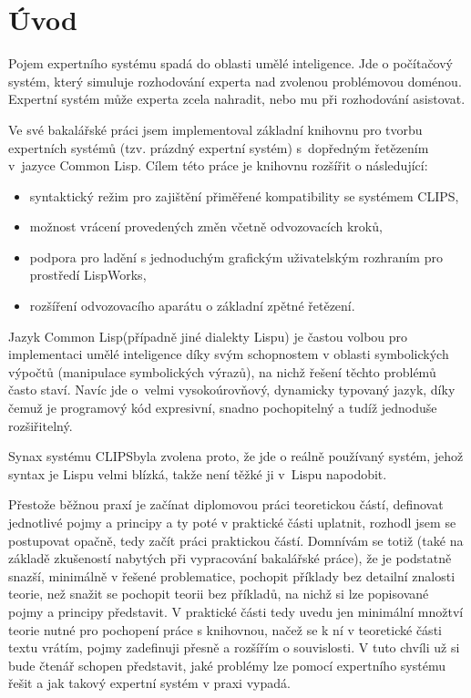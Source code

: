 \section{Úvod}

Pojem expertního systému spadá do oblasti umělé inteligence. Jde o počítačový
systém, který simuluje rozhodování experta nad zvolenou problémovou doménou.
Expertní systém může experta zcela nahradit, nebo mu při rozhodování asistovat.

Ve své bakalářské práci jsem implementoval základní knihovnu pro tvorbu
expertních systémů (tzv. prázdný expertní systém) s~dopředným řetězením v~jazyce
Common Lisp. Cílem této práce je knihovnu rozšířit o následující:
\begin{itemize}
  \item syntaktický režim pro zajištění přiměřené kompatibility se systémem
    CLIPS,
  \item možnost vrácení provedených změn včetně odvozovacích kroků,
  \item podpora pro ladění s jednoduchým grafickým uživatelským rozhraním pro
    prostředí LispWorks\texttrademark,
  \item rozšíření odvozovacího aparátu o základní zpětné řetězení.
\end{itemize}

Jazyk Common Lisp\footnotemark[1] (případně jiné dialekty Lispu) je častou volbou
pro implementaci umělé inteligence díky svým schopnostem v oblasti symbolických
výpočtů (manipulace symbolických výrazů), na nichž řešení těchto problémů často
staví. Navíc jde o~velmi vysokoúrovňový, dynamicky typovaný jazyk, díky čemuž je
programový kód expresivní, snadno pochopitelný a tudíž jednoduše rozšiřitelný.

Synax systému CLIPS\footnotemark[2] byla zvolena proto, že jde o reálně používaný
systém\footnotemark[3], jehož syntax je Lispu velmi blízká, takže není těžké ji
v~Lispu napodobit.

Přestože běžnou praxí je začínat diplomovou práci teoretickou částí, definovat
jednotlivé pojmy a principy a ty poté v praktické části uplatnit, rozhodl jsem
se postupovat opačně, tedy začít práci praktickou částí. Domnívám se totiž (také
na základě zkušeností nabytých při vypracování bakalářské práce), že je podstatně
snazší, minimálně v řešené problematice, pochopit příklady bez detailní znalosti
teorie, než snažit se pochopit teorii bez příkladů, na nichž si lze popisované
pojmy a principy představit. V praktické části tedy uvedu jen minimální množtví
teorie nutné pro pochopení práce s knihovnou, načež se k ní v teoretické části
textu vrátím, pojmy zadefinuji přesně a rozšířím o souvislosti. V tuto chvíli už
si bude čtenář schopen představit, jaké problémy lze pomocí expertního systému
řešit a jak takový expertní systém v praxi vypadá.

